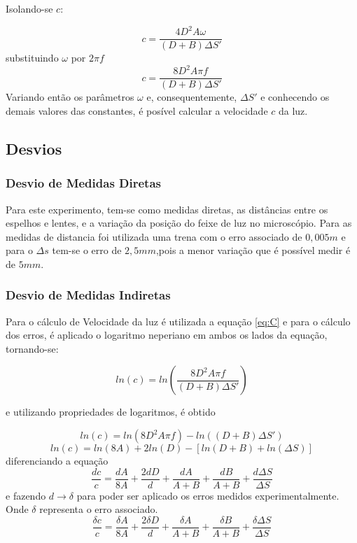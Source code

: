 Isolando-se $c$:

\begin{equation}
	c=\frac{4D^{2}A\omega}{(D+B)\Delta S'}
\end{equation}
substituindo $\omega$ por $2\pi f$
\begin{equation}
	c=\frac{8D^{2}A\pi f}{(D+B)\Delta S'}
\label{eq:C}
\end{equation}
Variando então os parâmetros $\omega$ e, consequentemente, $\Delta S'$ e conhecendo os demais valores das constantes, é posível calcular a velocidade $c$ da luz.

\subsection{Desvios}
\subsubsection{Desvio de Medidas Diretas}
Para este experimento, tem-se como medidas diretas, as distâncias entre os espelhos e lentes, e a variação da posição do feixe de luz no microscópio. Para as medidas de distancia foi utilizada uma trena com o erro associado de $0,005m$ e para o $\Delta s$ tem-se o erro de $2,5mm$,pois a menor variação que é possível medir é de $5mm$.
\subsubsection{Desvio de Medidas Indiretas}
Para o cálculo de Velocidade da luz é utilizada a equação \ref{eq:C} e para o cálculo dos erros, é aplicado o logaritmo neperiano em ambos os lados da equação, tornando-se:

\begin{equation}
	ln(c)=ln(\frac{8D^{2}A\pi f}{(D+B)\Delta S'})
\end{equation}

e utilizando propriedades de logaritmos, é obtido

\begin{equation}
	ln(c)=ln(8D^{2}A\pi f)-ln((D+B)\Delta S')
\end{equation}
\begin{equation}
	ln(c)=ln(8A) + 2ln(D) - [ln(D+B)+ln(\Delta S)]
\end{equation}
diferenciando a equação
\begin{equation}
	\frac{dc}{c}=\frac{dA}{8A} + \frac{2dD}{d} + \frac{dA}{A+B} + \frac{dB}{A+B}+\frac{d\Delta S}{\Delta S}
\end{equation}
e fazendo $d\rightarrow \delta$ para poder ser aplicado os erros medidos experimentalmente. Onde $\delta$ representa o erro associado.
\begin{equation}
	\frac{\delta c}{c}=\frac{\delta A}{8A} + \frac{2\delta D}{d} + \frac{\delta A}{A+B} + \frac{\delta B}{A+B}+\frac{\delta \Delta S}{\Delta S}
\label{eq:err}
\end{equation}
